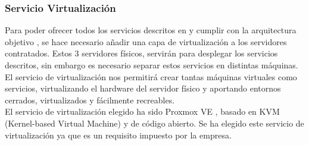 \subsubsection{Servicio Virtualización}
\begin{text}
	Para poder ofrecer todos los servicios descritos en  y cumplir con la arquitectura objetivo , se hace necesario añadir una capa de virtualización a los servidores contratados. Estos 3 servidores físicos, servirán para desplegar los servicios descritos, sin embargo es necesario separar estos servicios en distintas máquinas. El servicio de virtualización nos permitirá crear tantas máquinas virtuales como servicios, virtualizando el hardware del servidor físico y aportando entornos cerrados, virtualizados y fácilmente recreables. \\
	El servicio de virtualización elegido ha sido Proxmox VE \cite{proxmox:online}, basado en KVM (Kernel-based Virtual Machine) y de código abierto. Se ha elegido este servicio de virtualización ya que es un requisito impuesto por la empresa.
\end{text}

